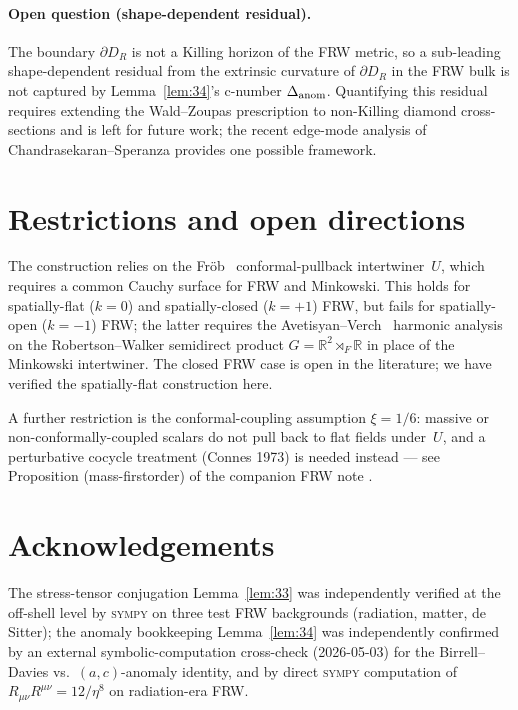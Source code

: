 \documentclass[11pt,a4paper]{article}
\theoremstyle{remark}
\begin{document}
\paragraph{Open question (shape-dependent residual).}
The boundary $\partial D_R$ is not a Killing horizon of the FRW metric,
so a sub-leading shape-dependent residual from the extrinsic curvature
of $\partial D_R$ in the FRW bulk is not captured by Lemma~\ref{lem:34}'s
c-number $\Delta_{\rm anom}$. Quantifying this residual requires
extending the Wald--Zoupas prescription \cite{WaldZoupas2000} to
non-Killing diamond cross-sections and is left for future work; the
recent edge-mode analysis of Chandrasekaran--Speranza
\cite{ChandrasekaranSperanza2020} provides one possible framework.

\section{Restrictions and open directions}
\label{sec:restrictions}

The construction relies on the Fr\"ob~\cite{Frob2023} conformal-pullback
intertwiner~$U$, which requires a common Cauchy surface for FRW and
Minkowski. This holds for spatially-flat ($k=0$) and spatially-closed
($k=+1$) FRW, but fails for spatially-open ($k=-1$) FRW; the latter
requires the Avetisyan--Verch~\cite{AvetisyanVerch2013} harmonic
analysis on the Robertson--Walker semidirect product
$G=\mathbb R^{2}\rtimes_{F}\mathbb R$ in place of the Minkowski
intertwiner. The closed FRW case is open in the literature; we have
verified the spatially-flat construction here.

A further restriction is the conformal-coupling assumption $\xi=1/6$:
massive or non-conformally-coupled scalars do not pull back to flat
fields under~$U$, and a perturbative cocycle treatment (Connes 1973)
is needed instead --- see Proposition (mass-firstorder) of the
companion FRW note \cite{ECI_FRW_note}.

\section*{Acknowledgements}

The stress-tensor conjugation Lemma~\ref{lem:33} was independently
verified at the off-shell level by \textsc{sympy} on three test FRW
backgrounds (radiation, matter, de Sitter); the anomaly bookkeeping
Lemma~\ref{lem:34} was independently confirmed by an external symbolic-computation cross-check
(2026-05-03) for the Birrell--Davies vs.\ $(a,c)$-anomaly identity, and
by direct \textsc{sympy} computation of $R_{\mu\nu}R^{\mu\nu}=12/\eta^{8}$
on radiation-era FRW.
\end{document}
